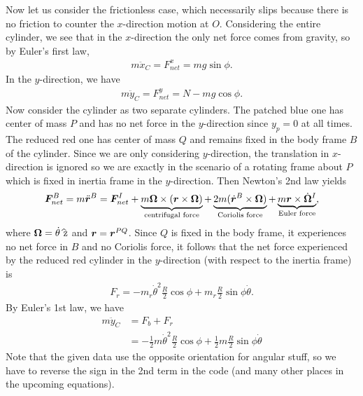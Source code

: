 \documentclass[12pt]{article}
\begin{document}
Now let us consider the frictionless case, which necessarily slips because there is no friction to counter the $ x$-direction motion at $ O$. Considering the entire cylinder, we see that in the $ x$-direction the only net force comes from gravity, so by Euler's first law,
 \begin{align*}
	m\ddot{x}_C = F_{net}^{x} = mg \sin\phi.
\end{align*}
In the $ y$-direction, we have 
\begin{align*}
	m\ddot{y}_C = F_{net}^{y} = N - mg \cos \phi .
\end{align*}
Now consider the cylinder as two separate cylinders. The patched blue one has center of mass $ P$ and has no net force in the  $ y$-direction since $ y_p = 0$ at all times. The reduced red one has center of mass $ Q$ and remains fixed in the body frame $ B$ of the cylinder. Since we are only considering $ y$-direction, the translation in  $ x$-direction is ignored so we are exactly in the scenario of a rotating frame about $ P$ which is fixed in inertia frame in the  $ y$-direction. Then Newton's 2nd law yields
\begin{align*}
     {\bm{F}}_{net}^B = m \ddot{{\bm{r}}}^B = {\bm{F}}_{net}^I + \underbrace{m{\bm{\Omega}} \times ({\bm{r}} \times {\bm{\Omega}})}_{\text{centrifugal force}} + \underbrace{2 m ( \dot{{\bm{r}}}^B \times {\bm{\Omega}} )}_{\text{Coriolis force}} + \underbrace{m {\bm{r}} \times \dot{{\bm{\Omega}}}^I}_{\text{Euler force}}, 
\end{align*}
where $ \ve{ \Omega} = \dot{\theta} \wh{ z}$ and $ {\bm{ r}} = {\bm{ r}}^{PQ}$. Since $ Q$ is fixed in the body frame, it experiences no net force in $ B$ and no Coriolis force, it follows that the net force experienced by the reduced red cylinder in the $ y$-direction (with respect to the inertia frame) is
\begin{align*}
	F_r = - m_r \dot{\theta}^2 \frac{R}{2} \cos \phi + m_r \frac{R}{2} \sin \phi \dot{\theta} .
\end{align*}
By Euler's 1st law, we have
\begin{align*}
	m \ddot{y}_C &= F_b + F_r \\
	&= - \frac{1}{2}m \dot{\theta}^2 \frac{R}{2} \cos \phi + \frac{1}{2}m \frac{R}{2} \sin \phi \dot{\theta} 
\end{align*}
Note that the given data use the opposite orientation for angular stuff, so we have to reverse the sign in the 2nd term in the code (and many other places in the upcoming equations).
\end{document}
